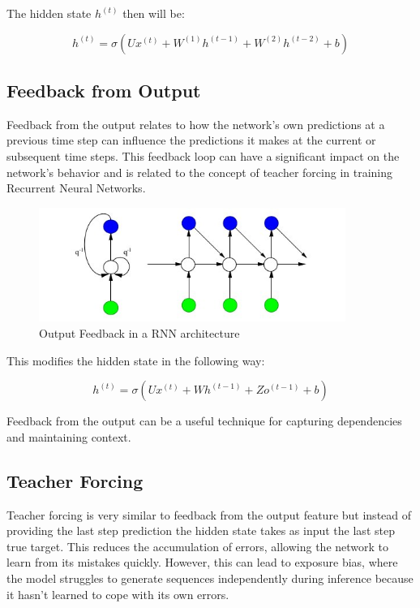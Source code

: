 \noindent The hidden state $h^{(t)}$ then will be:

$$ h^{(t)} = \sigma \left( U x^{(t)} + W^{(1)} h^{(t-1)} + W^{(2)} h^{(t-2)} + b \right) $$

\subsection{Feedback from Output}

Feedback from the output relates to how the network's own predictions at a previous time step can influence the predictions it makes at the current or subsequent time steps. This feedback loop can have a significant impact on the network's behavior and is related to the concept of teacher forcing in training Recurrent Neural Networks. 

\begin{figure}[h]
    \centering
    \includegraphics[width=10cm]{Images/output-feedback.jpg}
    \caption{Output Feedback in a RNN architecture}
    \label{fig:output-feedback}
\end{figure}

\noindent This modifies the hidden state in the following way:

$$ h^{(t)} = \sigma \left( U x^{(t)} + W h^{(t-1)} + Z o^{(t - 1)} + b \right) $$

\noindent Feedback from the output can be a useful technique for capturing dependencies and maintaining context.

\subsection{Teacher Forcing}

Teacher forcing is very similar to feedback from the output feature but instead of providing the last step prediction the hidden state takes as input the last step true target. This reduces the accumulation of errors, allowing the network to learn from its mistakes quickly. However, this can lead to exposure bias, where the model struggles to generate sequences independently during inference because it hasn't learned to cope with its own errors.

